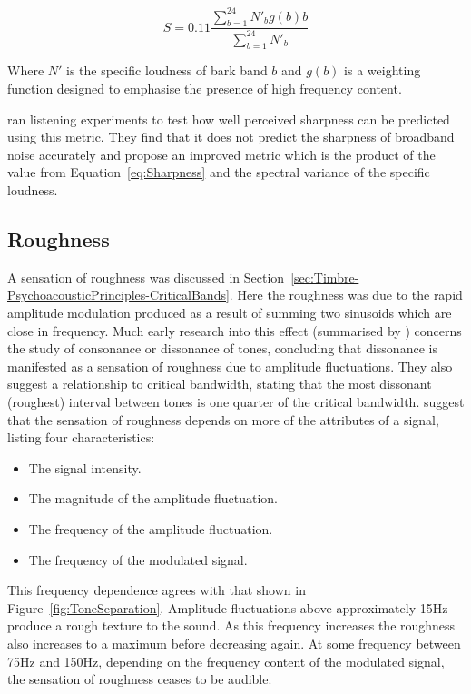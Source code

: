		\begin{equation}
			S = 0.11\frac{\sum_{b = 1}^{24} N'_{b}g(b)b}{\sum_{b = 1}^{24}N'_{b}}
			\label{eq:Sharpness}
		\end{equation}

		Where $N'$ is the specific loudness of bark band $b$ and $g(b)$ is a weighting function designed to
		emphasise the presence of high frequency content.

		\citet{marui2006predicting} ran listening experiments to test how well perceived sharpness can be predicted
		using this metric. They find that it does not predict the sharpness of broadband noise accurately and
		propose an improved metric which is the product of the value from Equation~\ref{eq:Sharpness} and the
		spectral variance of the specific loudness.

	\subsection{Roughness}
	\label{sec:Timbre-TimbralFeatures-Roughness}
		A sensation of roughness was discussed in Section~\ref{sec:Timbre-PsychoacousticPrinciples-CriticalBands}.
		Here the roughness was due to the rapid amplitude modulation produced as a result of summing two sinusoids
		which are close in frequency. Much early research into this effect (summarised by \citet{plomp1965tonal})
		concerns the study of consonance or dissonance of tones, concluding that dissonance is manifested as a
		sensation of roughness due to amplitude fluctuations. They also suggest a relationship to critical
		bandwidth, stating that the most dissonant (roughest) interval between tones is one quarter of the critical
		bandwidth. \citet{vassilakis2010psychoacoustic} suggest that the sensation of roughness depends on more of
		the attributes of a signal, listing four characteristics:

		\begin{itemize}
			\item The signal intensity.
			\item The magnitude of the amplitude fluctuation.
			\item The frequency of the amplitude fluctuation.
			\item The frequency of the modulated signal.
		\end{itemize}

		This frequency dependence agrees with that shown in Figure~\ref{fig:ToneSeparation}. Amplitude fluctuations
		above approximately 15Hz produce a rough texture to the sound. As this frequency increases the roughness
		also increases to a maximum before decreasing again. At some frequency between 75Hz and 150Hz, depending on
		the frequency content of the modulated signal, the sensation of roughness ceases to be audible.

